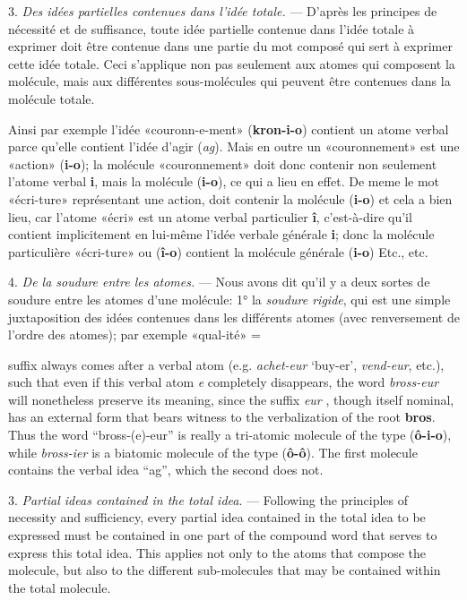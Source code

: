 \begin{sloppypar}
{{    3. \emph{Des idées partielles contenues dans l'idée totale.} —
    D'après les principes de nécessité et de suffisance, toute idée
    partielle contenue dans l’idée totale à exprimer doit être
    contenue dans une partie du mot composé qui sert à exprimer cette
    idée totale. Ceci s’applique non pas seulement aux atomes qui
    composent la molécule, mais aux différentes sous-molécules qui
    peuvent être contenues dans la molécule totale.

    Ainsi par exemple l’idée «couronn-e-ment» (\textbf{kron-i-o})
    contient un atome verbal parce qu’elle contient l'idée d’agir
    (\emph{ag}). Mais en outre un «couronnement» est une «action»
    (\textbf{i-o}); la molécule «couronnement» doit donc contenir non
    seulement l’atome verbal \textbf{i}, mais la molécule
    (\textbf{i-o}), ce qui a lieu en effet. De meme le mot «écri-ture»
    représentant une action, doit contenir la molécule (\textbf{i-o})
    et cela a bien lieu, car l’atome «écri» est un atome verbal
    particulier \textbf{î}, c’est-à-dire qu’il contient
    implicitement en lui-même l'idée verbale générale \textbf{i}; donc
    la molécule particulière «écri-ture» ou (\textbf{î-o}) contient la
    molécule générale (\textbf{i-o}) Etc., etc.

    4. \emph{De la soudure entre les atomes.} — Nous avons dit qu’il y
    a deux sortes de soudure entre les atomes d’une molécule: 1° la
    \emph{soudure rigide}, qui est une simple juxtaposition des idées
    contenues dans les différents atomes (avec renversement de l’ordre
    des atomes); par exemple «qual-ité» =}

}
%
{\noindent
  {\small suffix always comes after a verbal atom (e.g. \emph{achet-eur}
    `buy-er', \emph{vend-eur}, etc.), such that even if this verbal atom
    \emph{e} completely disappears, the word \emph{bross-eur} will
    nonetheless preserve its meaning, since the suffix \emph{eur} ,
    though itself nominal, has an external form that bears witness to
    the verbalization of the root \textbf{bros}.  Thus the word
    ``bross-(e)-eur'' is really a tri-atomic molecule of the type
    (\textbf{ô-i-o}), while \emph{bross-ier} is a biatomic molecule of
    the type (\textbf{ô-ô}). The first molecule contains the
    verbal idea ``ag'', which the second does not.

    3. \emph{Partial ideas contained in the total idea}. --- Following
    the principles of necessity and sufficiency, every partial idea
    contained in the total idea to be expressed must be contained in
    one part of the compound word that serves to express this total
    idea. This applies not only to the atoms that compose the
    molecule, but also to the different sub-molecules that may be
    contained within the total molecule.

}}
\end{sloppypar}
